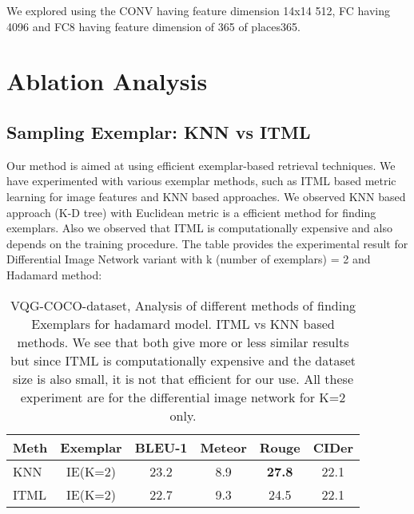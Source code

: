 \documentclass[11pt,a4paper]{article}
\begin{document}
We explored using the CONV having feature dimension 14x14 512, FC having 4096 and FC8 having feature dimension of 365 of places365.



\section{Ablation Analysis}\label{disc}
\subsection{Sampling Exemplar: KNN vs ITML}
Our method is aimed at using efficient exemplar-based retrieval techniques. 
We have experimented with various exemplar methods, such as  ITML \cite{davis_ACM2007} based metric learning for image features and KNN based approaches. We observed KNN based approach (K-D tree) with Euclidean metric is a efficient method for finding exemplars. Also we observed that ITML is computationally expensive and also depends on the training procedure. The table provides the experimental result for Differential Image Network variant with k (number of exemplars) = 2  and Hadamard method:	

 \begin{table}[h!]
\scriptsize
\centering
\begin{tabular}{|l|c|cccc|}
\hline \bf Meth & \bf Exemplar & \bf BLEU-1 & \bf Meteor & \bf Rouge  & \bf CIDer \\ \hline
KNN &IE(K=2)& 23.2 &8.9 & \textbf{27.8} & 22.1\\ 
ITML &IE(K=2)& 22.7 &9.3 & 24.5 & 22.1\\ \hline
\end{tabular}
\caption{\label{score_tab_11a}VQG-COCO-dataset, Analysis of different methods of finding Exemplars for hadamard model. ITML vs KNN based methods. We see that both give more or less similar results but since ITML is computationally expensive and the dataset size is also small, it is not that efficient for our use. All these experiment are for the differential image network for K=2 only.}
\end{table}
\end{document}
